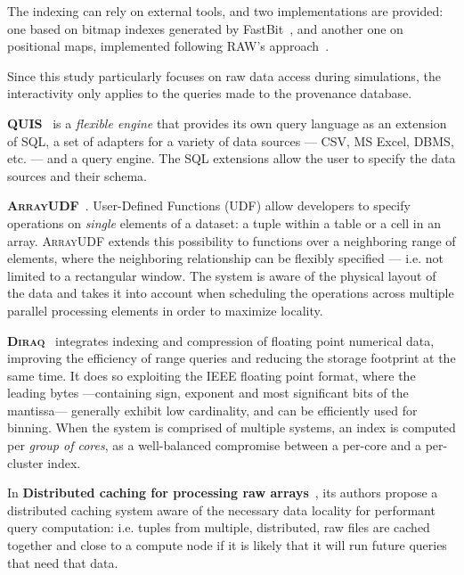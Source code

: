 The indexing can rely on external tools, and two implementations are provided:
one based on bitmap indexes generated by FastBit~\cite{Wu2009},
and another one on positional maps, implemented following \textsc{RAW}'s 
approach~\cite{Karpathiotakis2014}.

Since this study particularly focuses on raw data access during simulations, the 
interactivity only applies to the queries made to the provenance database.

\medskip

\textbf{\textsc{QUIS}}~\cite{chamanara_quis_2017} is a \emph{flexible engine} that
provides its own query language as an extension of SQL, a set of adapters for a variety of
data sources --- \gls{CSV}, MS Excel, \gls{DBMS}, etc. --- and a query engine. The SQL
extensions allow the user to specify the data sources and their schema.

\medskip

\textbf{\textsc{ArrayUDF}}~\cite{dong_arrayudf_2017}. User-Defined Functions (UDF)
allow developers to specify operations on \emph{single} elements of a dataset: a tuple within
a table or a cell in an array. \textsc{ArrayUDF} extends this possibility to functions over
a neighboring range of elements, where the neighboring relationship can be flexibly specified
--- i.e. not limited to a rectangular window. The system is aware of the physical layout of the data
and takes it into account when scheduling the operations across multiple parallel processing elements
in order to maximize locality.

\medskip

\textbf{\textsc{Diraq}}~\cite{lakshminarasimhan_scalable_2018} integrates indexing and compression of floating
point numerical data, improving the efficiency of range queries and reducing the storage footprint
at the same time. It does so exploiting the IEEE floating point format, where the leading bytes
---containing sign, exponent and most significant bits of the mantissa--- generally exhibit low
cardinality, and can be efficiently used for binning. When the system is comprised of multiple systems,
an index is computed per \emph{group of cores}, as a well-balanced compromise between a per-core and a
per-cluster index.

\medskip

In \textbf{Distributed caching for processing raw arrays}~\cite{zhao_distributed_2018}, its
authors propose a distributed caching system aware of the necessary data locality for performant
query computation: i.e. tuples from multiple, distributed, raw files are cached together and close
to a compute node if it is likely that it will run future queries that need that data.

